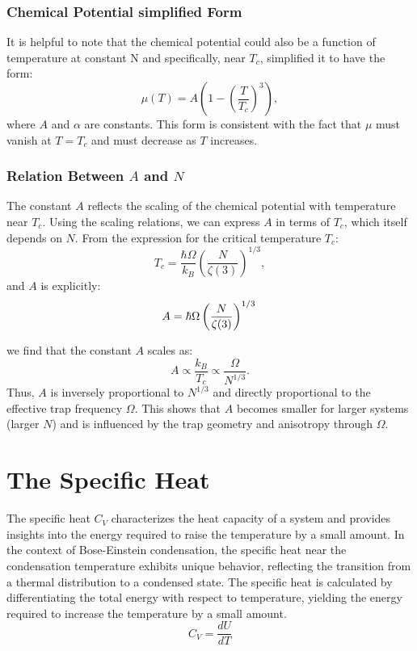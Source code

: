 \documentclass{article}
\numberwithin{equation}{section}
\numberwithin{equation}{subsection}
\begin{document}
\subsubsection{Chemical Potential simplified Form}

It is helpful to note that the chemical potential could also be a function of temperature at constant N and specifically, near \(T_c\), simplified it to have the form:
\[
\mu(T) = A (1 - (\frac{T}{T_c})^3),
\]
where \(A\) and \(\alpha\) are constants. This form is consistent with the fact that \(\mu\) must vanish at \(T = T_c\) and must decrease as \(T\) increases.

\subsubsection{Relation Between \(A\) and \(N\)}

The constant \(A\) reflects the scaling of the chemical potential with temperature near \(T_c\). Using the scaling relations, we can express \(A\) in terms of \(T_c\), which itself depends on \(N\). From the expression for the critical temperature \(T_c\):
\[
T_c = \frac{\hbar \Omega}{k_B} \left( \frac{N}{\zeta(3)} \right)^{1/3},
\]
and \(A\) is explicitly:
\[
    A = \hbar \Omega \left( \frac{N}{\zeta(3)}\right)^{1/3} \\
\]

we find that the constant \(A\) scales as:
\[
A \propto \frac{k_B}{T_c} \propto \frac{\Omega}{N^{1/3}}.
\]
Thus, \(A\) is inversely proportional to \(N^{1/3}\) and directly proportional to the effective trap frequency \(\Omega\). This shows that \(A\) becomes smaller for larger systems (larger \(N\)) and is influenced by the trap geometry and anisotropy through \(\Omega\).



\section{The Specific Heat}
The specific heat \( C_V \) characterizes the heat capacity of a system and provides insights into the energy required to raise the temperature by a small amount. In the context of Bose-Einstein condensation, the specific heat near the condensation temperature exhibits unique behavior, reflecting the transition from a thermal distribution to a condensed state. The specific heat is calculated by differentiating the total energy with respect to temperature, yielding the energy required to increase the temperature by a small amount.\\
$$C_V = \frac{dU}{dT}$$
\end{document}
